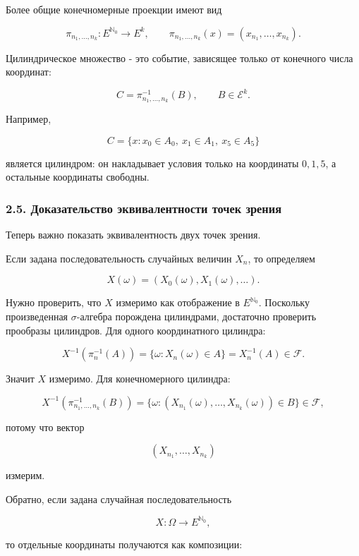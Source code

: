 \documentclass[
  11pt,
  a4paper,
]{article}
\begin{document}
Более общие конечномерные проекции имеют вид

\[
\pi_{n_1,\ldots,n_k}:E^{\mathbb N_0}\to E^k,
\qquad
\pi_{n_1,\ldots,n_k}(x)=(x_{n_1},\ldots,x_{n_k}).
\]

Цилиндрическое множество - это событие, зависящее только от конечного
числа координат:

\[
C=\pi_{n_1,\ldots,n_k}^{-1}(B),
\qquad
B\in\mathcal E^k.
\]

Например,

\[
C=\{x:x_0\in A_0,\ x_1\in A_1,\ x_5\in A_5\}
\]

является цилиндром: он накладывает условия только на координаты
\(0,1,5\), а остальные координаты свободны.

\subsubsection{2.5. Доказательство эквивалентности точек
зрения}\label{ux434ux43eux43aux430ux437ux430ux442ux435ux43bux44cux441ux442ux432ux43e-ux44dux43aux432ux438ux432ux430ux43bux435ux43dux442ux43dux43eux441ux442ux438-ux442ux43eux447ux435ux43a-ux437ux440ux435ux43dux438ux44f}

Теперь важно показать эквивалентность двух точек зрения.

Если задана последовательность случайных величин \(X_n\), то определяем

\[
X(\omega)=(X_0(\omega),X_1(\omega),\ldots).
\]

Нужно проверить, что \(X\) измеримо как отображение в
\(E^{\mathbb N_0}\). Поскольку произведенная \(\sigma\)-алгебра
порождена цилиндрами, достаточно проверить прообразы цилиндров. Для
одного координатного цилиндра:

\[
X^{-1}(\pi_n^{-1}(A))
=
\{\omega:X_n(\omega)\in A\}
=
X_n^{-1}(A)\in\mathcal F.
\]

Значит \(X\) измеримо. Для конечномерного цилиндра:

\[
X^{-1}(\pi_{n_1,\ldots,n_k}^{-1}(B))
=
\{\omega:(X_{n_1}(\omega),\ldots,X_{n_k}(\omega))\in B\}\in\mathcal F,
\]

потому что вектор

\[
(X_{n_1},\ldots,X_{n_k})
\]

измерим.

Обратно, если задана случайная последовательность

\[
X:\Omega\to E^{\mathbb N_0},
\]

то отдельные координаты получаются как композиции:
\end{document}
